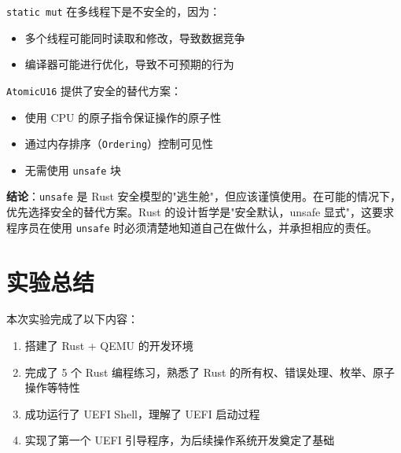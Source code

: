 \documentclass{SYSUReport}
\begin{document}
\texttt{static mut} 在多线程下是不安全的，因为：
\begin{itemize}
    \item 多个线程可能同时读取和修改，导致数据竞争
    \item 编译器可能进行优化，导致不可预期的行为
\end{itemize}

\texttt{AtomicU16} 提供了安全的替代方案：
\begin{itemize}
    \item 使用 CPU 的原子指令保证操作的原子性
    \item 通过内存排序（\texttt{Ordering}）控制可见性
    \item 无需使用 \texttt{unsafe} 块
\end{itemize}

\textbf{结论}：\texttt{unsafe} 是 Rust 安全模型的"逃生舱"，但应该谨慎使用。在可能的情况下，优先选择安全的替代方案。Rust 的设计哲学是"安全默认，unsafe 显式"，这要求程序员在使用 \texttt{unsafe} 时必须清楚地知道自己在做什么，并承担相应的责任。

\section{实验总结}

本次实验完成了以下内容：
\begin{enumerate}
    \item 搭建了 Rust + QEMU 的开发环境
    \item 完成了 5 个 Rust 编程练习，熟悉了 Rust 的所有权、错误处理、枚举、原子操作等特性
    \item 成功运行了 UEFI Shell，理解了 UEFI 启动过程
    \item 实现了第一个 UEFI 引导程序，为后续操作系统开发奠定了基础
\end{enumerate}

\clearpage
\end{document}
